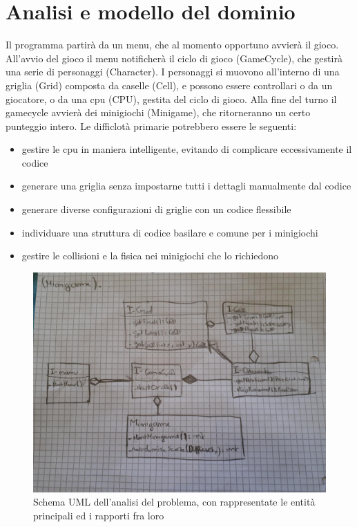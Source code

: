 \documentclass[a4paper,12pt]{report}
\begin{document}
\section{Analisi e modello del dominio}

Il programma partirà da un menu, che al momento opportuno avvierà il gioco.
%
All'avvio del gioco il menu notificherà il ciclo di gioco (GameCycle), che gestirà una serie di personaggi (Character).
%
I personaggi si muovono all'interno di una griglia (Grid) composta da caselle (Cell), e possono essere controllari o da un giocatore, o da una cpu (CPU), gestita del ciclo di gioco.
%
Alla fine del turno il gamecycle avvierà dei minigiochi (Minigame), che ritorneranno un certo punteggio intero.
%
Le difficlotà primarie potrebbero essere le seguenti:
\begin{itemize}
    \item gestire le cpu in maniera intelligente, evitando di complicare eccessivamente il codice
    \item generare una griglia senza impostarne tutti i dettagli manualmente dal codice
	\item generare diverse configurazioni di griglie con un codice flessibile
	\item individuare una struttura di codice basilare e comune per i minigiochi
    \item gestire le collisioni e la fisica nei minigiochi che lo richiedono
\end{itemize}

\begin{figure}[!t]
\centering{}
\includegraphics[width=150mm]{images/domain.jpeg}
\caption{Schema UML dell'analisi del problema, con rappresentate le entità principali ed i rapporti fra loro}
\label{img:analysis}
\end{figure}
\end{document}
